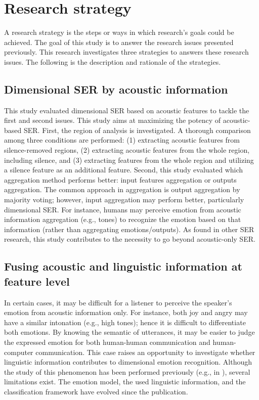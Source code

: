 \section{Research strategy}
A research strategy is the steps or ways in which research's goals could be
achieved. The goal of this study is to answer the research issues presented
previously. This research investigates three strategies to answers these
research issues. The following is the description and rationale of the
strategies.

\subsection{Dimensional SER by acoustic information}
This study evaluated dimensional SER based on acoustic features to tackle the
first and second issues.  This study aims at maximizing the potency of
acoustic-based SER. First, the region of analysis is investigated. A thorough
comparison among three conditions are performed: (1) extracting acoustic
features from silence-removed regions, (2) extracting acoustic features from
the whole region, including silence, and (3) extracting features from the whole
region and utilizing a silence feature as an additional feature. Second, this
study evaluated which aggregation method performs better: input features
aggregation or outputs aggregation. The common approach in aggregation is
output aggregation by majority voting; however, input aggregation may perform
better, particularly dimensional SER. For instance, humans may perceive emotion
from acoustic information aggregation (e.g., tones) to recognize the emotion
based on that information (rather than aggregating emotions/outputs). As found
in other SER research, this study contributes to the necessity to go beyond
acoustic-only SER.

\subsection{Fusing acoustic and linguistic information at feature level}
In certain cases, it may be difficult for a listener to perceive the speaker's
emotion from acoustic information only. For instance, both joy and angry may
have a similar intonation (e.g., high tones); hence it is difficult to
differentiate both emotions. By knowing the semantic of utterances, it may be
easier to judge the expressed emotion for both human-human communication and
human-computer communication.  This case raises an opportunity to investigate
whether linguistic information contributes to dimensional emotion recognition.
Although the study of this phenomenon has been performed previously (e.g., in
\cite{Karadogan2012}), several limitations exist. The emotion model, the used
linguistic information, and the classification framework have evolved since the
publication.

